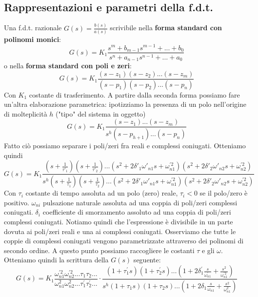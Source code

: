 \documentclass[11pt]{article}
\begin{document}
\subsection{Rappresentazioni e parametri della f.d.t.}
Una f.d.t. razionale $G(s)=\frac{b(s)}{a(s)}$ scrivibile nella \textbf{forma standard con polinomi monici}:
\begin{displaymath}
    G(s)=K_1\frac{s^m+b_{m-1}s^{m-1}+...+b_0}{s^n+a_{n-1}s^{n-1}+\dots+a_0}
\end{displaymath}
o nella \textbf{forma standard con poli e zeri}:\begin{displaymath}
    G(s)=K_1\frac{(s-z_1)(s-z_2)...(s-z_m)}{(s-p_1)(s-p_2)...(s-p_n)}
\end{displaymath}
Con $K_1$ costante di trasferimento. A partire dalla seconda forma possiamo fare un'altra elaborazione parametrica: ipotizziamo la presenza di un polo nell'origine di molteplicità $h$ ("tipo" del sistema in oggetto)
\begin{displaymath}
    G(s)=K_1\frac{(s-z_1)...(s-z_m)}{s^h(s-p_{h+1})...(s-p_n)}
\end{displaymath}
Fatto ciò possiamo separare i poli/zeri fra reali e complessi coniugati. Otteniamo quindi 
\begin{displaymath}
    G(s) = K_1\frac{\left(s+\frac{1}{\tau'_1}\right)\left(s+\frac{1}{\tau'_2}\right)\dots(s^2+2\delta'_1\omega'_{n1}s + \omega^{'2}_{n1})(s^2+2\delta'_2\omega'_{n2}s + \omega^{'2}_{n2})}{s^h\left(s+\frac{1}{\tau_1}\right)\left(s+\frac{1}{\tau_2}\right)\dots(s^2+2\delta'_1\omega'_{n1}s + \omega^{'2}_{n1})(s^2+2\delta'_2\omega'_{n2}s + \omega^{'2}_{n2})}
\end{displaymath}
Con $\tau_i$ costante di tempo assoluta ad un polo (zero) reale, $\tau_i<0$ se il polo/zero è positivo. $\omega_{ni}$ pulsazione naturale assoluta ad una coppia di poli/zeri complessi coniugati. $\delta_i$ coefficiente di smorzamento assoluto ad una coppia di poli/zeri complessi coniugati. Notiamo quindi che l'espressione è divisibile in un parte dovuta ai poli/zeri reali e una ai complessi coniugati. Osserviamo che tutte le coppie di complessi coniugati vengono parametrizzate attraverso dei polinomi di secondo ordine. A questo punto possiamo raccogliere le costanti $\tau$ e gli $\omega$. Otteniamo quindi la scrittura della $G(s)$ seguente:
\begin{displaymath}
    G(s)=K_1\frac{\omega^{'2}_{n1}\omega^{'2}_{n2}...\tau_1\tau_2...}{\omega^{2}_{n1}\omega^{2}_{n2}...\tau_1^{'}\tau_2^{'}...} \cdot \frac{(1+\tau_1^{'}s)(1+\tau_2^{'}s)\dots\left(1+2\delta^{'}_1 \frac{s}{\omega^{'}_{n1}}+\frac{s^2}{\omega^{'2}_{n1}}\right)}{s^h(1+\tau_1s)(1+\tau_2s)\dots\left(1+2\delta_1 \frac{s}{\omega_{n1}}+\frac{s^2}{\omega^{2}_{n1}}\right)}
\end{displaymath}
\end{document}
